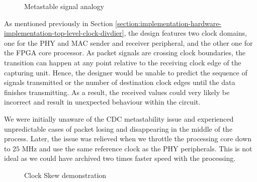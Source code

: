 \documentclass[a4paper]{report}
\begin{document}
\begin{figure}[h!]
  \caption{Metastable signal analogy \cite{stephenson-2009}}
  \label{fig:metastability-analogy}
\end{figure}

As mentioned previously in Section \ref{section:implementation-hardware-implementation-top-level-clock-divdier}, the design features two clock domains, one for the PHY and MAC sender and receiver peripheral, and the other one for the FPGA core processor. As packet signals are crossing clock boundaries, the transition can happen at any point relative to the receiving clock edge of the capturing unit. Hence, the designer would be unable to predict the sequence of signals transmitted or the number of destination clock edges until the data finishes transmitting. As a result, the received values could very likely be incorrect and result in unexpected behaviour within the circuit. 
 
We were initially unaware of the CDC metastability issue and experienced unpredictable cases of packet losing and disappearing in the middle of the process. Later, the issue was relieved when we throttle the processing core down to $25$ MHz and use the same reference clock as the PHY peripherals. This is not ideal as we could have archived two times faster speed with the processing.

\begin{figure}[h!]
  \caption{Clock Skew demonstration \cite{arar-2018}}
  \label{fig:clock-skew}
\end{figure}
\end{document}
